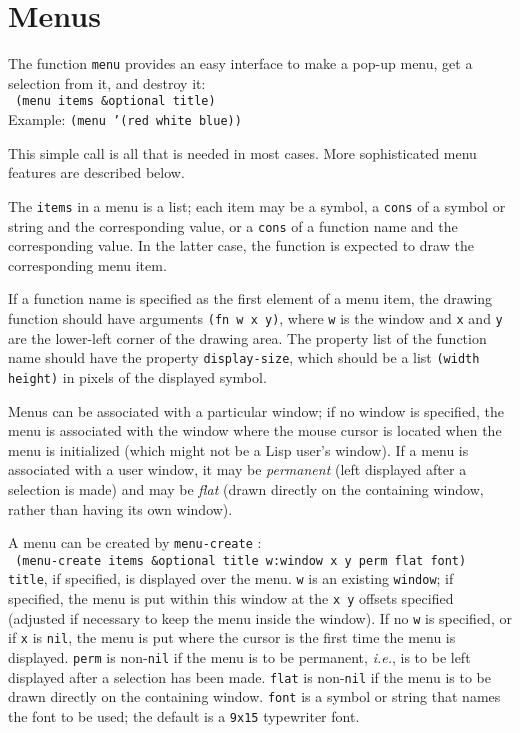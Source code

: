 \section{Menus}

The function {\tt menu} provides an easy interface to make a pop-up menu,
get a selection from it, and destroy it: \\

\vspace{-0.2in}
{\tt \hspace*{0.5in} (menu items \&optional title)} \\

\vspace{-0.1in}
Example: {\tt (menu '(red white blue))}

This simple call is all that is needed in most cases.
More sophisticated menu features are described below.

The {\tt items} in a menu is a list; each item may be a symbol, a {\tt cons}
of a symbol or string and the corresponding value, or a {\tt cons} of a
function name and the corresponding value.  In the latter case, the function
is expected to draw the corresponding menu item.

If a function name is specified as the first element of a menu item, the
drawing function should have arguments {\tt (fn w x y)}, where {\tt w}
is the window and {\tt x} and {\tt y} are the lower-left corner of the
drawing area.  The property list of the function name should have the
property {\tt display-size}, which should be a list {\tt (width height)}
in pixels of the displayed symbol.

Menus can be associated with a particular window; if no window is specified,
the menu is associated with the window where the mouse cursor is located
when the menu is initialized (which might not be a Lisp user's window).  If a
menu is associated with a user window, it may be {\em permanent} (left
displayed after a selection is made) and may be {\em flat} (drawn directly
on the containing window, rather than having its own window).

A menu can be created by {\tt menu-create} : \\

\vspace{-0.1in}
{\tt \hspace*{0.5in}
 (menu-create items \&optional title w:window x y perm flat font)} \\

\vspace{-0.1in}
{\tt title}, if specified, is displayed over the menu.
{\tt w} is an existing {\tt window}; if specified, the menu is put
within this window at the {\tt x y} offsets specified (adjusted if necessary
to keep the menu inside the window).  If no {\tt w}
is specified, or if {\tt x} is {\tt nil}, the menu is put where the cursor
is the first time the menu is displayed.
{\tt perm} is non-{\tt nil} if the menu is to be permanent, {\em i.e.}, is to
be left displayed after a selection has been made.
{\tt flat} is non-{\tt nil} if the menu is to be drawn directly on the
containing window.
{\tt font} is a symbol or string that names the font to be used; the
default is a {\tt 9x15} typewriter font.


